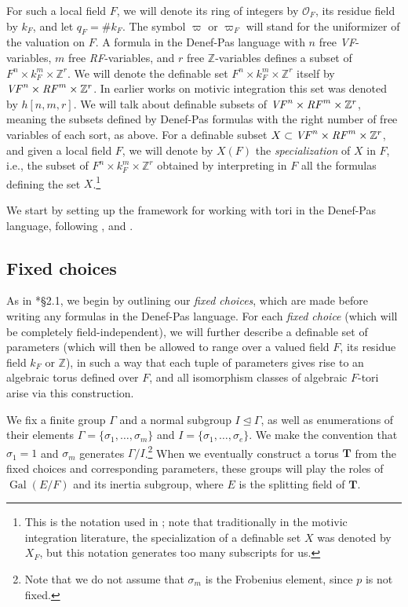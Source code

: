 \documentclass{amsart}
\newcommand{\Z}{{\mathbb Z}}
\newcommand{\ri}{\mathcal{O}}
\DeclareMathOperator{\gal}{Gal}
\newcommand{\bT}{\mathbf {T}}
\theoremstyle{plain}
\theoremstyle{definition}
\begin{document}
For such a local field $F$, we will denote its ring of integers by $\ri_F$, its residue field by $k_F$,
and let $q_F=\# k_F$. The symbol $\varpi$ or $\varpi_F$ will stand for the uniformizer of the valuation on $F$. 
A formula in the Denef-Pas language  with $n$ free \emph{VF}-variables, $m$ free \emph{RF}-variables, and $r$ free 
$\Z$-variables 
defines a subset of $F^n\times k_F^m \times \Z^r$. 
We will denote the definable set $F^n\times k_F^m \times \Z^r$ itself by
$\mbox{\emph{VF}}^n\times \mbox{\emph{RF}}^m\times \Z^r$.
In earlier works on motivic integration this set was denoted by $h[n,m,r]$. 
We will talk about definable subsets of $\mbox{\emph{VF}}^n\times \mbox{\emph{RF}}^m\times \Z^r$,
meaning the subsets defined by Denef-Pas formulas with the right number of free variables of each sort, as above. 
For a definable subset $X\subset \mbox{\emph{VF}}^n\times \mbox{\emph{RF}}^m\times \Z^r$, and given a local field $F$,  
we will denote by $X(F)$ the \emph{specialization} of $X$ in $F$, i.e., the subset of
$F^n\times k_F^m\times \Z^r$ obtained by interpreting in $F$ all the formulas defining the set $X$.\footnote{This
is the notation used in \cite{hales:transfert}; note that traditionally in the motivic integration literature,
the {specialization} of a definable set $X$ was denoted by $X_F$, but this notation generates too many subscripts for us.} 

We start by setting up the framework for working with tori in the Denef-Pas language,
following \cite{cluckers-hales-loeser}, \cite{CGH-2} and \cite{hales:transfert}.



\subsection{Fixed choices}\label{sub:fixedchoices}

As in \cite{hales:transfert}*{\S 2.1}, we begin by outlining our \emph{fixed choices},
which are made before writing any formulas in the Denef-Pas language.  
For each \emph{fixed choice} (which will be completely field-independent), we will further describe
a definable set of parameters (which will then be allowed to range over a valued field $F$,
its residue field $k_F$ or $\Z$), in such a way that each tuple of parameters gives rise to an algebraic torus
defined over $F$, and all isomorphism classes of algebraic $F$-tori arise via this construction.

We fix a finite group $\Gamma$ and a normal subgroup $I \unlhd \Gamma$,
as well as enumerations of their elements $\Gamma = \{\sigma_1, \dots, \sigma_m\}$ and
$I = \{\sigma_1, \dots, \sigma_e\}$.  We make the convention that $\sigma_1 = 1$ and $\sigma_m$
generates $\Gamma / I$.\footnote{Note that we do not assume that $\sigma_m$ is the Frobenius element, since $p$ is not fixed.}
When we eventually construct a torus $\bT$ from the fixed choices
and corresponding parameters, these groups will play the roles of $\gal(E/F)$
and its inertia subgroup, where $E$ is the splitting field of $\bT$.
\end{document}
